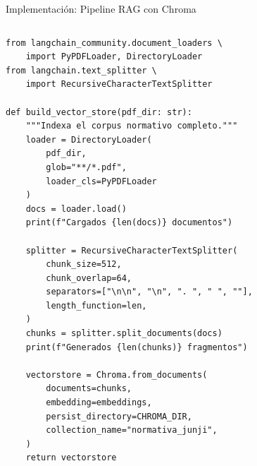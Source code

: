 \documentclass[aspectratio=169]{beamer}
\begin{document}
\begin{frame}[fragile]{Implementación: Pipeline RAG con Chroma}
  \begin{columns}
\begin{lstlisting}[style=pythonstyle, title=rag\_indexer.py]
from langchain_community.document_loaders \
    import PyPDFLoader, DirectoryLoader
from langchain.text_splitter \
    import RecursiveCharacterTextSplitter

def build_vector_store(pdf_dir: str):
    """Indexa el corpus normativo completo."""
    loader = DirectoryLoader(
        pdf_dir, 
        glob="**/*.pdf",
        loader_cls=PyPDFLoader
    )
    docs = loader.load()
    print(f"Cargados {len(docs)} documentos")

    splitter = RecursiveCharacterTextSplitter(
        chunk_size=512,
        chunk_overlap=64,
        separators=["\n\n", "\n", ". ", " ", ""],
        length_function=len,
    )
    chunks = splitter.split_documents(docs)
    print(f"Generados {len(chunks)} fragmentos")

    vectorstore = Chroma.from_documents(
        documents=chunks,
        embedding=embeddings,
        persist_directory=CHROMA_DIR,
        collection_name="normativa_junji",
    )
    return vectorstore


\end{lstlisting}
\end{columns}
\end{frame}
\end{document}
